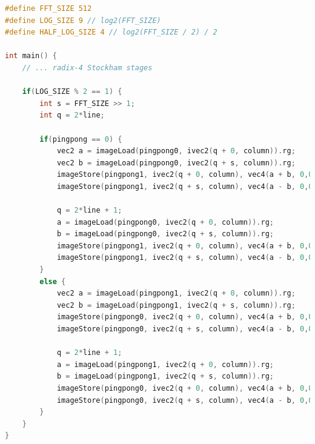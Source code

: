 \documentclass[
  oneside,
  11pt, a4paper,
  footinclude=true,
  headinclude=true,
  cleardoublepage=empty
]{scrbook}
\begin{document}
\begin{lstlisting}[language=C, caption={Radix-2 stage for the radix-4 Stockham code}, label={lst:radix4-stockham-radix2-stage}]
#define FFT_SIZE 512
#define LOG_SIZE 9 // log2(FFT_SIZE)
#define HALF_LOG_SIZE 4 // log2(FFT_SIZE / 2) / 2

int main() {
    // ... radix-4 Stockham stages

    if(LOG_SIZE % 2 == 1) {
        int s = FFT_SIZE >> 1;
        int q = 2*line;

        if(pingpong == 0) {
            vec2 a = imageLoad(pingpong0, ivec2(q + 0, column)).rg;
            vec2 b = imageLoad(pingpong0, ivec2(q + s, column)).rg;
            imageStore(pingpong1, ivec2(q + 0, column), vec4(a + b, 0,0));
            imageStore(pingpong1, ivec2(q + s, column), vec4(a - b, 0,0));

            q = 2*line + 1;
            a = imageLoad(pingpong0, ivec2(q + 0, column)).rg;
            b = imageLoad(pingpong0, ivec2(q + s, column)).rg;
            imageStore(pingpong1, ivec2(q + 0, column), vec4(a + b, 0,0));
            imageStore(pingpong1, ivec2(q + s, column), vec4(a - b, 0,0));
        }
        else {
            vec2 a = imageLoad(pingpong1, ivec2(q + 0, column)).rg;
            vec2 b = imageLoad(pingpong1, ivec2(q + s, column)).rg;
            imageStore(pingpong0, ivec2(q + 0, column), vec4(a + b, 0,0));
            imageStore(pingpong0, ivec2(q + s, column), vec4(a - b, 0,0));

            q = 2*line + 1;
            a = imageLoad(pingpong1, ivec2(q + 0, column)).rg;
            b = imageLoad(pingpong1, ivec2(q + s, column)).rg;
            imageStore(pingpong0, ivec2(q + 0, column), vec4(a + b, 0,0));
            imageStore(pingpong0, ivec2(q + s, column), vec4(a - b, 0,0));
        }
    }
}
\end{lstlisting}






\end{document}
